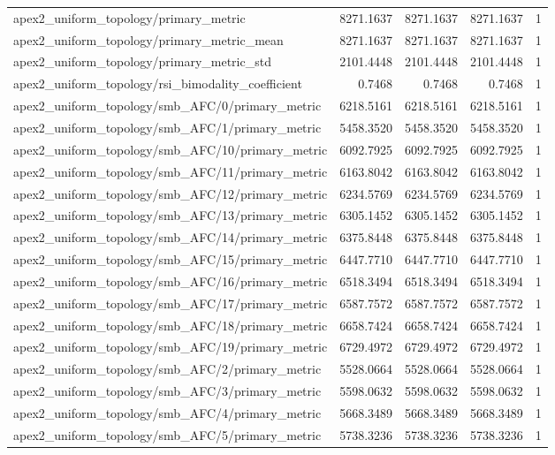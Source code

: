 \begin{table}[h]
\begin{tabular}{lrrrr}
apex2_uniform_topology/primary_metric & 8271.1637 & 8271.1637 & 8271.1637 & 1 \\
apex2_uniform_topology/primary_metric_mean & 8271.1637 & 8271.1637 & 8271.1637 & 1 \\
apex2_uniform_topology/primary_metric_std & 2101.4448 & 2101.4448 & 2101.4448 & 1 \\
apex2_uniform_topology/rsi_bimodality_coefficient & 0.7468 & 0.7468 & 0.7468 & 1 \\
apex2_uniform_topology/smb_AFC/0/primary_metric & 6218.5161 & 6218.5161 & 6218.5161 & 1 \\
apex2_uniform_topology/smb_AFC/1/primary_metric & 5458.3520 & 5458.3520 & 5458.3520 & 1 \\
apex2_uniform_topology/smb_AFC/10/primary_metric & 6092.7925 & 6092.7925 & 6092.7925 & 1 \\
apex2_uniform_topology/smb_AFC/11/primary_metric & 6163.8042 & 6163.8042 & 6163.8042 & 1 \\
apex2_uniform_topology/smb_AFC/12/primary_metric & 6234.5769 & 6234.5769 & 6234.5769 & 1 \\
apex2_uniform_topology/smb_AFC/13/primary_metric & 6305.1452 & 6305.1452 & 6305.1452 & 1 \\
apex2_uniform_topology/smb_AFC/14/primary_metric & 6375.8448 & 6375.8448 & 6375.8448 & 1 \\
apex2_uniform_topology/smb_AFC/15/primary_metric & 6447.7710 & 6447.7710 & 6447.7710 & 1 \\
apex2_uniform_topology/smb_AFC/16/primary_metric & 6518.3494 & 6518.3494 & 6518.3494 & 1 \\
apex2_uniform_topology/smb_AFC/17/primary_metric & 6587.7572 & 6587.7572 & 6587.7572 & 1 \\
apex2_uniform_topology/smb_AFC/18/primary_metric & 6658.7424 & 6658.7424 & 6658.7424 & 1 \\
apex2_uniform_topology/smb_AFC/19/primary_metric & 6729.4972 & 6729.4972 & 6729.4972 & 1 \\
apex2_uniform_topology/smb_AFC/2/primary_metric & 5528.0664 & 5528.0664 & 5528.0664 & 1 \\
apex2_uniform_topology/smb_AFC/3/primary_metric & 5598.0632 & 5598.0632 & 5598.0632 & 1 \\
apex2_uniform_topology/smb_AFC/4/primary_metric & 5668.3489 & 5668.3489 & 5668.3489 & 1 \\
apex2_uniform_topology/smb_AFC/5/primary_metric & 5738.3236 & 5738.3236 & 5738.3236 & 1 \\

\end{tabular}
\end{table}
